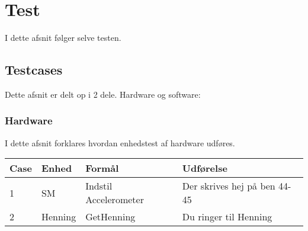 \chapter{Test}
I dette afsnit følger selve testen.
\section{Testcases}
Dette afsnit er delt op i  2 dele. Hardware og software:\\
\subsection{Hardware}
I dette afsnit forklares hvordan enhedstest af hardware udføres.
\begin{table}[htbp]
\centering
\begin{tabular}{| p{1.5cm}  | p{3cm} | p{4.5cm} | p{4.5cm} |}
\hline
Case &Enhed &Formål &Udførelse\\\hline
1 &SM &Indstil Accelerometer &Der skrives hej på ben 44-45\\\hline
2 &Henning &GetHenning &Du ringer til Henning\\\hline
\end{tabular}
\end{table}
